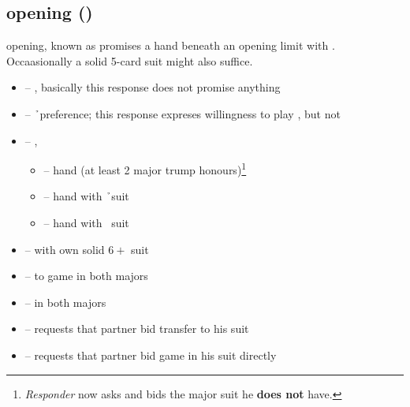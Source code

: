 \subsection{\ctr{2\protect\d} opening ()}
\label{subsec:2d-op}

\ctr{2\d} opening, known as  promises a hand beneath an opening limit with .
Occaasionally a solid 5-card suit might also suffice. \vspace{1em}

\begin{itemize}
  \item \ctr{2\h} -- \neg, basically this response does not promise anything
  \item \ctr{2\s} -- \h\ preference; this response expreses willingness to play \ctr{3\h}, but not \ctr{3\s}
  \item \ctr{2\nt} -- \gf, 
  \begin{itemize}
    \item \ctr{3\c} -- \pos\/ hand (at least 2 major trump honours)\footnote{
      \emph{Responder} now asks \ctr{3\d} and \opn\/ bids the major suit he \textbf{does not} have.
    }
    \item \ctr{3\d} -- \neg\/ hand with \h\ suit
    \item \ctr{3\h} -- \neg\/ hand with \s\ suit
  \end{itemize}
  \item \ctr{3\c} -- \gf\/ with own solid $6+$ suit
  \item \ctr{3\d} -- \inv\/ to game \ws{} in both majors
  \item \ctr{3\h} -- \preempt\/ \ws{} in both majors
  \item \ctr{4\c} -- requests that partner bid transfer to his suit
  \item \ctr{4\d} -- requests that partner bid game in his suit directly
\end{itemize}
